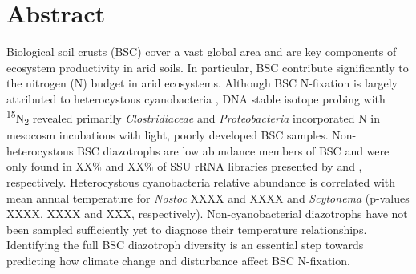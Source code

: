 \section{Abstract}
Biological soil crusts (BSC) cover a vast global area and are key components of ecosystem productivity in arid soils. In particular, BSC contribute significantly to the nitrogen (N) budget in arid ecosystems. Although BSC N-fixation is largely attributed to heterocystous cyanobacteria \cite{Yeager, 14766579, Yeager_2012}, DNA stable isotope probing with \textsuperscript{15}N\textsubscript{2} revealed primarily \textit{Clostridiaceae} and \textit{Proteobacteria} incorporated N in mesocosm incubations with light, poorly developed BSC samples. Non-heterocystous BSC diazotrophs are low abundance members of BSC and were only found in XX\% and XX\% of SSU rRNA libraries presented by \citet{Garcia_Pichel_2013} and \citet{Steven_2013}, respectively. Heterocystous cyanobacteria relative abundance is correlated with mean annual temperature for \textit{Nostoc} XXXX and XXXX and \textit{Scytonema} (p-values XXXX, XXXX and XXX, respectively). Non-cyanobacterial diazotrophs have not been sampled sufficiently yet to diagnose their temperature relationships. Identifying the full BSC diazotroph diversity is an essential step towards predicting how climate change and disturbance affect BSC N-fixation.